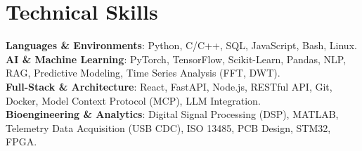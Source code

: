 \documentclass[letterpaper,11pt]{article}
\begin{document}
\section{Technical Skills}
 \begin{itemize}[leftmargin=0.15in, label={}]
    \small{\item{
     \textbf{Languages \& Environments}{: Python, C/C++, SQL, JavaScript, Bash, Linux.} \\
     \textbf{AI \& Machine Learning}{: PyTorch, TensorFlow, Scikit-Learn, Pandas, NLP, RAG, Predictive Modeling, Time Series Analysis (FFT, DWT).} \\
     \textbf{Full-Stack \& Architecture}{: React, FastAPI, Node.js, RESTful API, Git, Docker, Model Context Protocol (MCP), LLM Integration.} \\
     \textbf{Bioengineering \& Analytics}{: Digital Signal Processing (DSP), MATLAB, Telemetry Data Acquisition (USB CDC), ISO 13485, PCB Design, STM32, FPGA.}
    }}
 \end{itemize}

\end{document}
